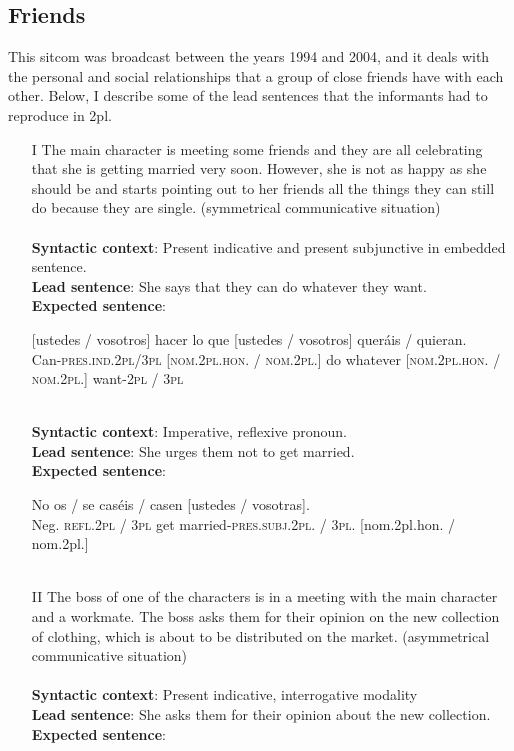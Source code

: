 \documentclass[output=paper]{LSP/langsci}
\begin{document}
\subsection{Friends}
\largerpage
This sitcom was broadcast between the years 1994 and 2004, and it deals with the personal and social relationships that a group of close friends have with each other. Below, I describe some of the lead sentences that the informants had to reproduce in 2pl.

\begin{enumerate}
\item [I] The main character is meeting some friends and they are all celebrating that she is getting married very soon. However, she is not as happy as she should be and starts pointing out to her friends all the things they can still do because they are single. (symmetrical communicative situation)\\
\\
\textbf{Syntactic context}: Present indicative and present subjunctive in embedded sentence.\\
\textbf{Lead sentence}: She says that they can do whatever they want. \\
\textbf{Expected sentence}:

\ea
{} {[ustedes / vosotros]} hacer {lo que} {[ustedes / vosotros]} {queráis / quieran}.\\
{Can-\textsc{pres.ind.2pl/3pl}} \textsc{[nom.2pl.hon. / nom.2pl.]} do whatever \textsc{[nom.2pl.hon. / nom.2pl.]} want-\textsc{2pl / 3pl}\\
\\
\z

\textbf{Syntactic context}: Imperative, reflexive pronoun.\\
\textbf{Lead sentence}: She urges them not to get married.\\ 
\textbf{Expected sentence}:

\ea
\gll No   {os / se}               {caséis / casen}            {[ustedes / vosotras]}.\\
Neg. {\textsc{refl.2pl / 3pl}} {get married-\textsc{pres.subj.2pl. / 3pl.}} {[nom.2pl.hon. / nom.2pl.]}\\
\\
\z

\item [II] The boss of one of the characters is in a meeting with the main character and a workmate. The boss asks them for their opinion on the new collection of clothing, which is about to be distributed on the market. (asymmetrical communicative situation)\\
\\
\textbf{Syntactic context}: Present indicative, interrogative modality\\
\textbf{Lead sentence}: She asks them for their opinion about the new collection.\\
\textbf{Expected sentence}:


\end{enumerate}
\end{document}
